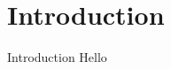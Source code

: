 \documentclass{beamer}
\title{\ThesisNameEN}
\date{\today}
\author{\authorNameEN}
\institute{{\facultyEn}, {\universityEn}}
\begin{document}
\maketitle

\section{Introduction}
\begin{frame}{Introduction}
  Hello
\end{frame}
\end{document}
